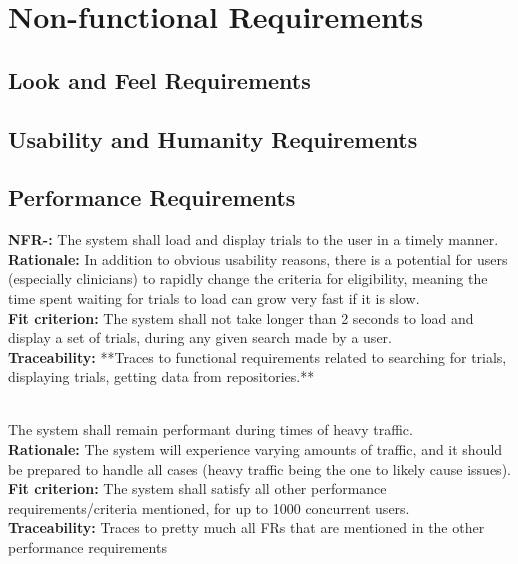 \documentclass[12pt, titlepage]{article}
\newcounter{NFR_Counter}
\newcounter{FR_Counter}
\begin{document}
\section{Non-functional Requirements}

\subsection{Look and Feel Requirements}

\subsection{Usability and Humanity Requirements}

\subsection{Performance Requirements}

\textbf{NFR-\the\value{NFR_Counter}:}
The system shall load and display trials to the user in a timely manner.\\
\textbf{Rationale:}
In addition to obvious usability reasons, there is a potential for users (especially clinicians) to rapidly
change the criteria for eligibility, meaning the time spent waiting for trials to load can grow very fast if it is slow.\\
\textbf{Fit criterion:}
The system shall not take longer than 2 seconds to load and display a set of trials, during any given search made by a user.\\
\textbf{Traceability:}
**Traces to functional requirements related to searching for trials, displaying trials, getting data from repositories.** \\~\\
\addtocounter{NFR_Counter}{1}

The system shall remain performant during times of heavy traffic.\\
\textbf{Rationale:}
The system will experience varying amounts of traffic, and it should be prepared to handle all cases (heavy traffic being the 
one to likely cause issues).\\
\textbf{Fit criterion:}
The system shall satisfy all other performance requirements/criteria mentioned, for up to 1000 concurrent users.\\
\textbf{Traceability:}
Traces to pretty much all FRs that are mentioned in the other performance requirements \\~\\
\addtocounter{NFR_Counter}{1}
\end{document}
